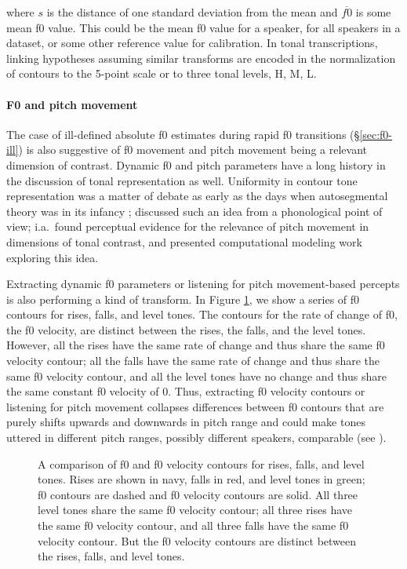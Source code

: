 \documentclass[12pt]{article}
\begin{document}
\noindent where $s$ is the distance of one standard deviation from the mean and
$\overline{f0}$ is some mean f0 value. This could be the mean f0 value
for a speaker, for all speakers in a dataset, or some other reference
value for calibration. In tonal transcriptions, linking hypotheses
assuming similar transforms are
encoded in the normalization of contours to the 5-point scale
\citep{Fon:1999} or to three tonal levels, H, M, L. 

\paragraph{F0 and pitch movement}

The case of ill-defined absolute f0 estimates during rapid f0
transitions (\S\ref{sec:f0-ill}) is also suggestive of f0 movement and
pitch movement being a relevant dimension of contrast. Dynamic f0 and
pitch parameters have a long history in the discussion of tonal
representation as well. Uniformity in contour tone representation was
a matter of debate as early as the days when autosegmental theory was
in its infancy \citep{Leben:1973}; \citet{Clark:1978} discussed such
an idea from a phonological point of view; \citet{Gandour:1978a} i.a.\
found perceptual evidence for the relevance of pitch movement in
dimensions of tonal contrast, and \citet{Gauthier:2007} presented
computational modeling work exploring this idea.

Extracting dynamic f0 parameters or listening for pitch movement-based
percepts is also performing a kind of transform. In Figure
\ref{fig:deriv}, we show a series of f0 contours for rises, falls, and
level tones. The contours for the rate of change of f0, the f0
velocity, are distinct between the rises, the falls, and the level
tones. However, all the rises have the same rate of change and thus
share the same f0 velocity contour; all the falls have the same rate
of change and thus share the same f0 velocity contour, and all the
level tones have no change and thus share the same constant f0
velocity of 0. Thus, extracting f0 velocity contours or listening for
pitch movement collapses differences between f0 contours that are
purely shifts upwards and downwards in pitch range and could make
tones uttered in different pitch ranges, possibly different speakers,
comparable (see \citet{Gauthier:2007}).

\begin{figure}
  \centering
  
  \caption{A comparison of f0 and f0 velocity contours for rises,
    falls, and level tones. Rises are shown in navy, falls in red, and
    level tones in green; f0 contours are
    dashed and f0 velocity contours are solid. All three level tones
    share the same f0 velocity contour; all three
    rises have the same f0 velocity contour, and all three
    falls have the same f0 velocity contour. But the f0 velocity
    contours are distinct between the rises, falls, and level tones.}
  \label{fig:deriv}
\end{figure}
\end{document}
